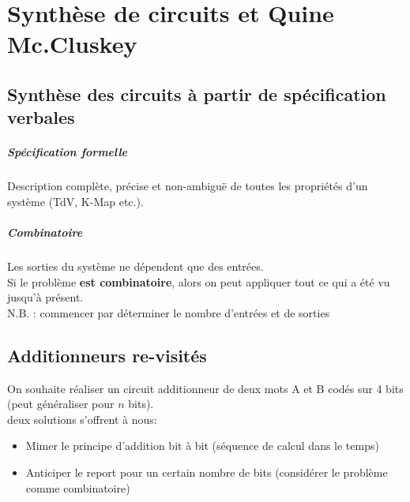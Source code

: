 \chapter{Synthèse de circuits et Quine Mc.Cluskey}
\section{Synthèse des circuits à partir de spécification verbales}
\paragraph{Spécification formelle} Description complète, précise et non-ambiguë de toutes les propriétés d'un système (TdV, K-Map etc.).
\paragraph{Combinatoire} Les sorties du système ne dépendent que des entrées.\\

Si le problème \textbf{est combinatoire}, alors on peut appliquer tout ce qui a été vu jusqu'à présent.\\
N.B. : commencer par déterminer le nombre d'entrées et de sorties
\section{Additionneurs re-visités}
On souhaite réaliser un circuit additionneur de deux mots A et B codés sur 4 bits (peut généraliser pour $n$ bits).\\
deux solutions s'offrent à nous:
\begin{itemize}
	\item Mimer le principe d'addition bit à bit (séquence de calcul dans le temps)
	\item Anticiper le report pour un certain nombre de bits (considérer le problème comme combinatoire)
\end{itemize}
